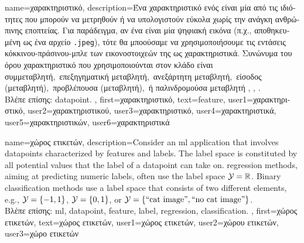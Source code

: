 {name={\foreignlanguage{greek}{χαρακτηριστικό}},
	description={\foreignlanguage{greek}{Ένα χαρακτηριστικό ενός} 
		 \foreignlanguage{greek}{είναι μία από τις ιδιότητες που μπορούν να μετρηθούν  
		ή να υπολογιστούν εύκολα χωρίς την ανάγκη ανθρώπινης εποπτείας. Για παράδειγμα, αν ένα}  
		\foreignlanguage{greek}{είναι μία ψηφιακή εικόνα (π.χ., αποθηκευμένη ως ένα αρχείο} \texttt{.jpeg}), 
		\foreignlanguage{greek}{τότε θα μποούσαμε να χρησιμοποιήσουμε τις εντάσεις κόκκινου-πράσινου-μπλε  
		των εικονοστοιχεών της ως χαρακτηριστικά. Συνώνυμα του όρου χαρακτηριστικό που χρησιμοποιούνται στον κλάδο είναι 
		\guillemotleft συμμεταβλητή,\guillemotright\ \guillemotleft επεξηγηματική μεταβλητή,\guillemotright\ 
		\guillemotleft ανεξάρτητη μεταβλητή,\guillemotright\ \guillemotleft είσοδος (μεταβλητή),\guillemotright\ 
		\guillemotleft προβλέπουσα (μεταβλητή),\guillemotright\ ή 
		\guillemotleft παλινδρομούσα μεταβλητή\guillemotright} \cite{Gujarati2021}, \cite{Dodge2003}, \cite{Everitt2022}.\\
		\foreignlanguage{greek}{Βλέπε επίσης:} \gls{datapoint}.
		}, first={\foreignlanguage{greek}{χαρακτηριστικό}},
		text={feature},
		user1={\foreignlanguage{greek}{χαρακτηριστικό}}, %
		user2={\foreignlanguage{greek}{χαρακτηριστικού}}, %
		user3={\foreignlanguage{greek}{χαρακτηριστικό}}, %
		user4={\foreignlanguage{greek}{χαρακτηριστικά}}, %
		user5={\foreignlanguage{greek}{χαρακτηριστικών}}, %
		user6={\foreignlanguage{greek}{χαρακτηριστικά}} %
}

{name={\foreignlanguage{greek}{χώρος ετικετών}},
	description={Consider an \gls{ml} application that involves \gls{datapoint}s characterized by \gls{feature}s 
		and \gls{label}s. The \gls{label} space is constituted by all potential values that the \gls{label} 
		of a \gls{datapoint} can take on. \Gls{regression} methods, aiming at predicting numeric \gls{label}s, often
		 use the \gls{label} space $\mathcal{Y} = \mathbb{R}$. Binary \gls{classification} methods use a \gls{label} space 
 		that consists of two different elements, e.g., $\mathcal{Y} =\{-1,1\}$, $\mathcal{Y}=\{0,1\}$, 
		or $\mathcal{Y} = \{ \mbox{``cat image''}, \mbox{``no cat image''} \}$.\\
		\foreignlanguage{greek}{Βλέπε επίσης:} \gls{ml}, \gls{datapoint}, \gls{feature}, \gls{label}, \gls{regression}, \gls{classification}.
		}, first={\foreignlanguage{greek}{χώρος ετικετών}},
		text={\foreignlanguage{greek}{χώρος ετικετών}},
		user1={\foreignlanguage{greek}{χώρος ετικετών}}, %
  		user2={\foreignlanguage{greek}{χώρου ετικετών}}, %
		user3={\foreignlanguage{greek}{χώρο ετικετών}} %
}

